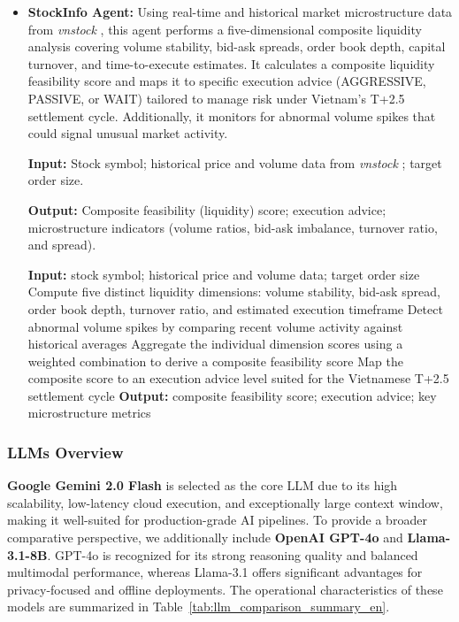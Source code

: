 \documentclass{ieeeaccess}
\begin{document}
\begin{itemize}
    \textbf{Output:} Macro regime (RISK-ON / RISK-OFF / NEUTRAL); market pressure score;
    macro factor signals (interest rate, inflation, monetary policy stance); sector rotation
    summary; short-term market outlook.


    \item \textbf{StockInfo Agent:}
    Using real-time and historical market microstructure data from \textit{vnstock} \cite{vnstock2023},
    this agent performs a five-dimensional composite liquidity analysis covering volume stability,
    bid-ask spreads, order book depth, capital turnover, and time-to-execute estimates. It calculates
    a composite liquidity feasibility score and maps it to specific execution advice (AGGRESSIVE, PASSIVE,
    or WAIT) tailored to manage risk under Vietnam's T+2.5 settlement cycle. Additionally, it monitors for
    abnormal volume spikes that could signal unusual market activity.

    \textbf{Input:} Stock symbol; historical price and volume data from \textit{vnstock} \cite{vnstock2023};
    target order size.

    \textbf{Output:} Composite feasibility (liquidity) score; execution advice; microstructure
    indicators (volume ratios, bid-ask imbalance, turnover ratio, and spread).

    \begin{algorithmic}[1]
    \STATE \textbf{Input:} stock symbol; historical price and volume data; target order size
    \STATE Compute five distinct liquidity dimensions: volume stability, bid-ask spread, order book depth, turnover ratio, and estimated execution timeframe
    \STATE Detect abnormal volume spikes by comparing recent volume activity against historical averages
    \STATE Aggregate the individual dimension scores using a weighted combination to derive a composite feasibility score
    \STATE Map the composite score to an execution advice level suited for the Vietnamese T+2.5 settlement cycle
    \STATE \textbf{Output:} composite feasibility score; execution advice; key microstructure metrics
    \end{algorithmic}

  \end{itemize}


\subsubsection{LLMs Overview}
\textbf{Google Gemini 2.0 Flash} is selected as the core LLM due to its high scalability, low-latency cloud execution, and exceptionally large context window, making it well-suited for production-grade AI pipelines. To provide a broader comparative perspective, we additionally include \textbf{OpenAI GPT-4o} and \textbf{Llama-3.1-8B}. GPT-4o is recognized for its strong reasoning quality and balanced multimodal performance, whereas Llama-3.1 offers significant advantages for privacy-focused and offline deployments. The operational characteristics of these models are summarized in Table~\ref{tab:llm_comparison_summary_en}.
\end{document}
